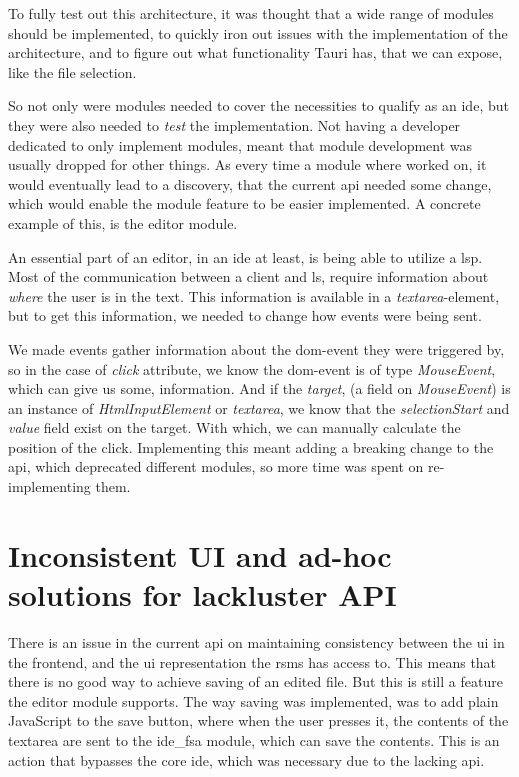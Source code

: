 To fully test out this architecture, it was thought that a wide range of modules
should be implemented, to quickly iron out issues with the implementation of the
architecture, and to figure out what functionality Tauri has, that we can
expose, like the file selection.

So not only were modules needed to cover the necessities to qualify as an
\gls*{ide}, but they were also needed to \textit{test} the implementation. Not
having a developer dedicated to only implement modules, meant that module
development was usually dropped for other things. As every time a module where
worked on, it would eventually lead to a discovery, that the current \gls*{api}
needed some change, which would enable the module feature to be easier
implemented. A concrete example of this, is the editor module.

An essential part of an editor, in an \gls*{ide} at least, is being able to
utilize a \gls*{lsp}. Most of the communication between a client and \gls*{ls},
require information about \textit{where} the user is in the text. This
information is available in a \textit{textarea}-element, but to get this
information, we needed to change how events were being sent.

We made events gather information about the \gls*{dom}-event they were
triggered by, so in the case of \textit{click} attribute, we know the
\gls*{dom}-event is of type \textit{MouseEvent}, which can give us some,
information. And if the \textit{target}, (a field on \textit{MouseEvent}) is an
instance of \textit{HtmlInputElement} or \textit{textarea}, we know that the
\textit{selectionStart} and \textit{value} field exist on the target. With
which, we can manually calculate the position of the click. Implementing this
meant adding a breaking change to the \gls*{api}, which deprecated different
modules, so more time was spent on re-implementing them.


\section{Inconsistent UI and ad-hoc solutions for lackluster API} \label{sec:lackluster}

There is an issue in the current \gls*{api} on maintaining consistency between
the \gls*{ui} in the frontend, and the \gls*{ui} representation the \gls*{rsms}
has access to. This means that there is no good way to achieve saving of an
edited file. But this is still a feature the editor module supports. The way
saving was implemented, was to add plain JavaScript to the save button, where
when the user presses it, the contents of the textarea are sent to the ide\_fsa
module, which can save the contents. This is an action that bypasses the core
\gls*{ide}, which was necessary due to the lacking \gls*{api}.



